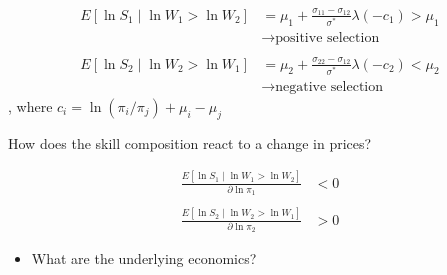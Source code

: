 \begin{frame}
\begin{align*}
E[\ln S_1 \mid \ln W_1 > \ln W_2] & = \mu_1 + \frac{\sigma_{11} - \sigma_{12}}{\sigma^*} \lambda(-c_1) > \mu_1\\
								  & \rightarrow \text{positive selection} \\
								  & \\
E[\ln S_2 \mid \ln W_2 > \ln W_1] & = \mu_2 + \frac{\sigma_{22} - \sigma_{12}}{\sigma^*} \lambda(-c_2) < \mu_2 \\
& \rightarrow \text{negative selection}
\end{align*}
, where $c_i = \ln(\pi_i / \pi_j) + \mu_i - \mu_j$



\end{frame}

\begin{frame}

How does the skill composition react to a change in prices?

\begin{align*}
\frac{E[\ln S_1 \mid \ln W_1 > \ln W_2]}{\partial \ln \pi_1 } & < 0 \\
&\\
\frac{E[\ln S_2 \mid \ln W_2 > \ln W_1]}{\partial \ln \pi_2 } & > 0
\end{align*}

\begin{itemize}
\item What are the underlying economics?
\end{itemize}

\end{frame}
